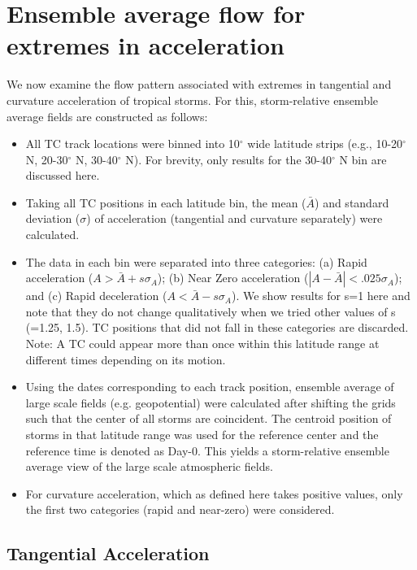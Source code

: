 \documentclass[wcd,manuscript]{copernicus}
\begin{document}
\section{Ensemble average flow for extremes in acceleration}

We now examine the flow pattern associated with extremes in tangential and curvature acceleration of tropical storms. For this, storm-relative ensemble average fields are constructed as follows:

\begin{itemize}
    \item All TC track locations were binned into 10$^\circ$ wide latitude strips (e.g.,  10-20$^\circ$ N, 20-30$^\circ$ N, 30-40$^\circ$ N). For brevity, only results for the 30-40$^\circ$ N bin are discussed here.
    
    \item Taking all TC positions in each latitude bin, the mean ($\bar{A}$) and standard deviation ($\sigma$) of  acceleration (tangential and curvature separately) were calculated. 

    \item The data in each bin were separated into three categories: (a) Rapid acceleration ($A > \bar A + s \sigma_A$); (b) Near Zero acceleration ($ |A - \bar{A}| < .025\sigma_A$); and (c) Rapid deceleration ($A  < \bar A - s\sigma_A$). We show results for s=1 here and note that they do not change qualitatively when we tried other values of s (=1.25, 1.5). TC positions that did not fall in these categories are discarded. Note: A TC could appear more than once within this latitude range at different times depending on its motion.
    
    \item Using the dates corresponding to each track position, ensemble average of large scale fields (e.g. geopotential) were calculated after shifting the grids such that the center of all storms are coincident. The centroid position of storms in that latitude range was used for the reference center and the reference time is denoted as Day-0.  This yields a storm-relative ensemble average view of the large scale atmospheric fields.
    
    \item  For curvature acceleration, which as defined here takes positive values, only the first two categories (rapid and near-zero) were considered.
    
\end{itemize}

\subsection{Tangential Acceleration}
\end{document}
